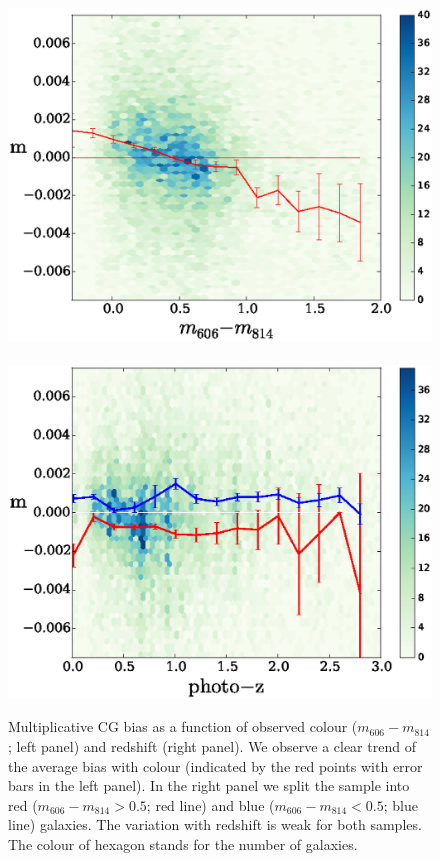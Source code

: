 \documentclass[useAMS,usenatbib]{mnras}
\begin{document}
%
\begin{figure}
\hbox{%
\includegraphics[width=0.5\hsize]{zheatcolor29.eps}
\includegraphics[width=0.5\hsize]{zphotozheat29.eps}}
\caption{Multiplicative CG bias as a function of observed colour ($m_{606}-m_{814}$; left panel)
and redshift (right panel). We observe a clear trend of the average bias with colour (indicated by
the red points with error bars in the left panel). In the right panel we split the sample into red
($m_{606}-m_{814}>0.5$; red line) and blue ($m_{606}-m_{814}<0.5$; blue line) galaxies. The
variation with redshift is weak for both samples. The colour of hexagon stands for the number of galaxies.}
\label{fig:cg2color}
\end{figure}
\end{document}
